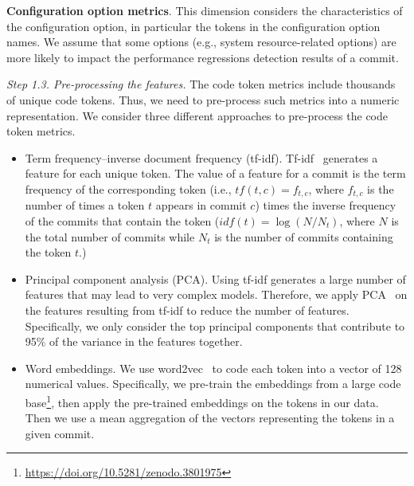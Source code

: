     \textbf{Configuration option metrics}. This dimension considers the characteristics of the configuration option, in particular the tokens in the configuration option names. We assume that some options (e.g., system resource-related options) are more likely to impact the performance regressions detection results of a commit.


\textit{Step 1.3. Pre-processing the features.}
The code token metrics include thousands of unique code tokens. Thus, we need to pre-process such metrics into a numeric representation. We consider three different approaches to pre-process the code token metrics. 
\begin{itemize}
    \item Term frequency–inverse document frequency (tf-idf). Tf-idf~\cite{ramos2003using} generates a feature for each unique token. The value of a feature for a commit is the term frequency of the corresponding token (i.e., $tf(t,c) = f_{t,c}$, where $f_{t,c}$ is the number of times a token $t$ appears in commit $c$) times the inverse frequency of the commits that contain the token ($idf(t) = \log{(N/N_t)}$, where $N$ is the total number of commits while $N_t$ is the number of commits containing the token $t$.) %
    
    \item Principal component analysis (PCA). Using tf-idf generates a large %
    number of features that may lead to very complex models. Therefore, we apply PCA~\cite{wold1987principal} on the features resulting from tf-idf to reduce the number of features. Specifically, we only consider the top principal components that contribute to 95\% of the variance in the features together.
    
    \item Word embeddings. We use word2vec~\cite{Mikolov:2013:DRW:2999792.2999959,Mikolov2013} to code each token into a vector of 128 numerical values. Specifically, we pre-train the embeddings from a large code base\footnote{\url{https://doi.org/10.5281/zenodo.3801975}}, %
    then apply the pre-trained embeddings on the tokens in our data. Then we use a mean aggregation of the vectors representing the tokens in a given commit.
    
    
    
\end{itemize}

